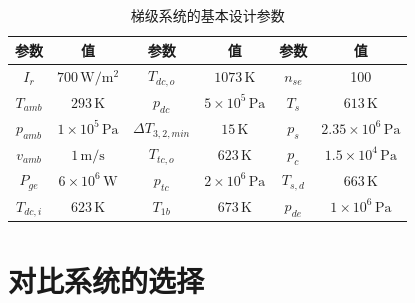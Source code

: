 \begin{table}[htbp]
	\caption{梯级系统的基本设计参数}
	\begin{center}
	\begin{tabular}{cccccc}
		\toprule
		参数		&	值	&	参数		&	值	&	参数		&	值\\
		\midrule
		$I_r$		&	$700\,\mathrm{W/m^2}$	&	$T_{dc,o}$	&	$1073\,\mathrm{K}$	&	$n_{se}$	&	100\\
		$T_{amb}$	&	$293\,\mathrm{K}$	&	$p_{dc}$		&	$5\times10^5\,\mathrm{Pa}$	&	$T_s$	&	$613\,\mathrm{K}$\\
		$p_{amb}$	&	$1\times10^5\,\mathrm{Pa}$	&	$\Delta{}T_{3,2,min}$	&	$15\,\mathrm{K}$	&	$p_s$	&	$2.35\times10^6\,\mathrm{Pa}$\\
		$v_{amb}$	&	$1\,\mathrm{m/s}$	&	$T_{tc,o}$	&	$623\,\mathrm{K}$	&	$p_c$	&	$1.5\times10^4\,\mathrm{Pa}$\\
		$P_{ge}$	&	$6\times10^6\,\mathrm{W}$	&	
$p_{tc}$	&	$2\times10^6\,\mathrm{Pa}$	&	$T_{s,d}$	&	$663\,\mathrm{K}$\\
		$T_{dc,i}$		&	$623\,\mathrm{K}$	&	$T_{1b}$	&	$673\,\mathrm{K}$	&	$p_{de}$ 	& 	$1\times10^6\,\mathrm{Pa}$\\			
		\bottomrule
	\end{tabular}
	\end{center}
	\label{tab:CascadeSystemParameters}
\end{table}

\section{对比系统的选择}

